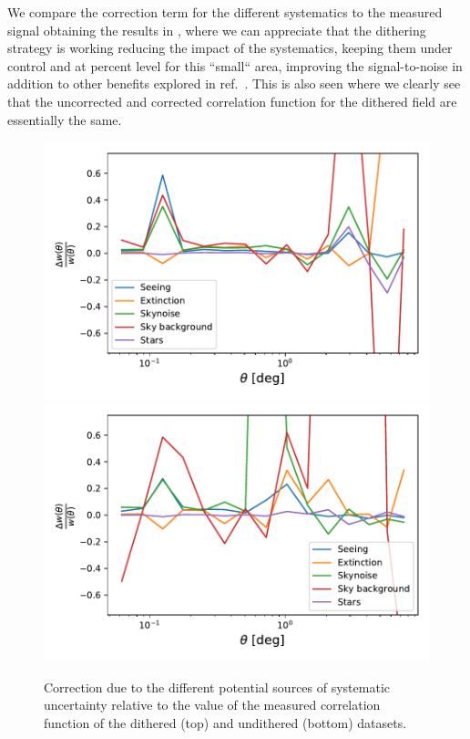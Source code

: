 \documentclass[\docopts]{\docclass}
\begin{document}
We compare the correction term for the different systematics to the measured signal obtaining the results in , where we can appreciate that the dithering strategy is working reducing the impact of the systematics, keeping them under control and at percent level for this ``small`` area, improving the signal-to-noise in addition to other benefits explored in ref.~\citep{2016ApJ...829...50A}. This is also seen  where we clearly see that the uncorrected and corrected correlation function for the dithered field are essentially the same.
\begin{figure}
\centering
\includegraphics[width=0.9\columnwidth]{sys_dithered_25p3.pdf}
\includegraphics[width=0.9\columnwidth]{sys_undithered_25p3.pdf}
\caption{Correction due to the different potential sources of systematic uncertainty relative to the value of the measured correlation function of the dithered (top) and undithered (bottom) datasets.}
\label{fig:sys_realspace}
\end{figure}
\end{document}
